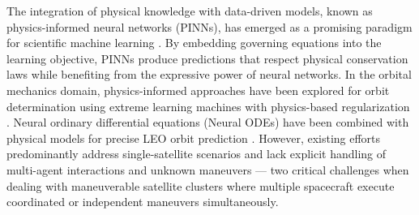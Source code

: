 \documentclass[a4paper,fleqn]{cas-dc}
\begin{document}
The integration of physical knowledge with data-driven models, known as physics-informed neural networks (PINNs), has emerged as a promising paradigm for scientific machine learning \cite{raissi2019physics}. By embedding governing equations into the learning objective, PINNs produce predictions that respect physical conservation laws while benefiting from the expressive power of neural networks. In the orbital mechanics domain, physics-informed approaches have been explored for orbit determination using extreme learning machines with physics-based regularization \cite{scorsoglio2023physics}. Neural ordinary differential equations (Neural ODEs) have been combined with physical models for precise LEO orbit prediction \cite{kamiya2023precise}. However, existing efforts predominantly address single-satellite scenarios and lack explicit handling of multi-agent interactions and unknown maneuvers --- two critical challenges when dealing with maneuverable satellite clusters where multiple spacecraft execute coordinated or independent maneuvers simultaneously.
\end{document}
